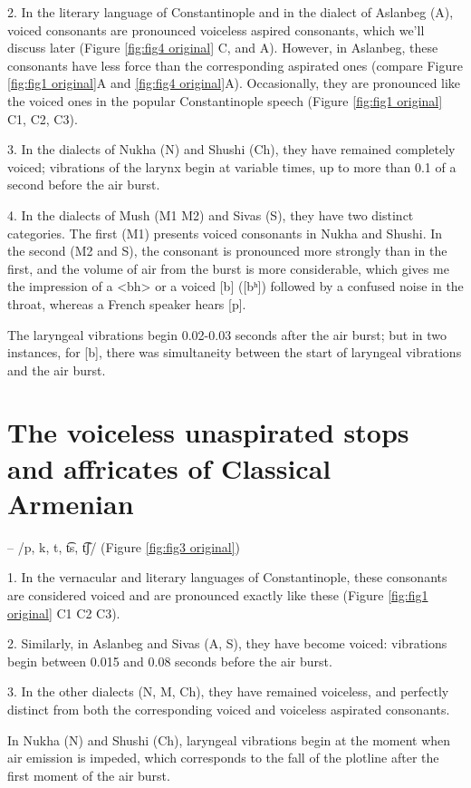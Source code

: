 2. In the literary language of Constantinople and in the dialect of Aslanbeg (A), voiced consonants are pronounced voiceless aspired consonants, which we'll discuss later (Figure \ref{fig:fig4 original} C, and A). However, in Aslanbeg, these consonants have less force than the corresponding aspirated ones (compare Figure \ref{fig:fig1 original}A and \ref{fig:fig4 original}A). Occasionally, they are pronounced like the voiced ones in the popular Constantinople speech (Figure \ref{fig:fig1 original} C1, C2, C3).

3. In the dialects of Nukha (N) and Shushi (Ch), they have remained completely voiced; vibrations of the larynx begin at variable times, up to more than 0.1 of a second before the air burst.

4. In the dialects of Mush (M1 M2) and Sivas (S), they have two distinct categories. The first (M1) presents voiced consonants in Nukha and Shushi. In the second (M2 and S), the consonant is pronounced more strongly than in the first, and the volume of air from the burst is more considerable,  which gives me the impression of a <bh> or a voiced [b] ([bʰ]) followed by a confused noise in the throat, whereas a French speaker hears [p].

The laryngeal vibrations begin 0.02-0.03 seconds after the air burst; but in two instances, for [b], there was simultaneity between the start of laryngeal vibrations and the air burst.

\section{The voiceless unaspirated stops and affricates of Classical Armenian}

 – /p,  k,  t, t͡s,  t͡ʃ/
(Figure \ref{fig:fig3 original})

1. In the vernacular and literary languages of Constantinople, these consonants are considered voiced and are pronounced exactly like these (Figure \ref{fig:fig1 original} C1 C2 C3).

2. Similarly, in Aslanbeg and Sivas (A, S), they have become voiced: vibrations begin between 0.015 and 0.08 seconds before the air burst.

3. In the other dialects (N, M, Ch), they have remained voiceless, and perfectly distinct from both the corresponding voiced and voiceless aspirated consonants.

In Nukha (N) and Shushi (Ch), laryngeal vibrations begin at the moment when air emission is impeded, which corresponds to the fall of the plotline after the first moment of the air burst.

